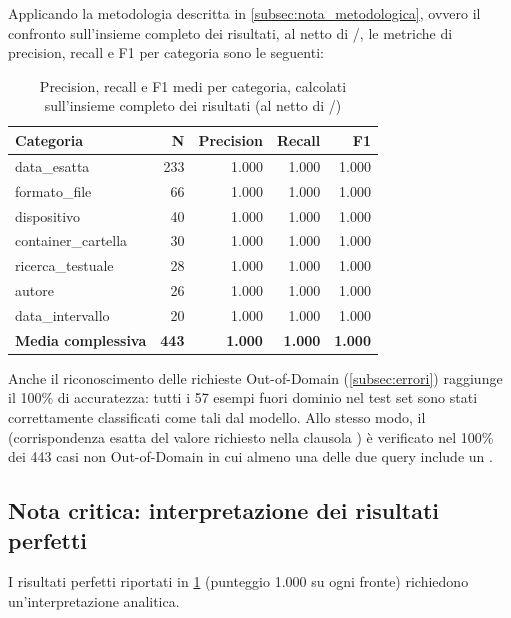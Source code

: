Applicando la metodologia descritta in \cref{subsec:nota_metodologica}, ovvero il confronto sull'insieme completo dei risultati, al netto di /, le metriche di precision, recall e F1 per categoria sono le seguenti:

\begin{table}[ht]
\centering
\begin{tabular}{lrrrr}
\toprule
Categoria & N & Precision & Recall & F1 \\
\midrule
data\_esatta        & 233 & 1.000 & 1.000 & 1.000 \\
formato\_file       & 66  & 1.000 & 1.000 & 1.000 \\
dispositivo         & 40  & 1.000 & 1.000 & 1.000 \\
container\_cartella & 30  & 1.000 & 1.000 & 1.000 \\
ricerca\_testuale   & 28  & 1.000 & 1.000 & 1.000 \\
autore              & 26  & 1.000 & 1.000 & 1.000 \\
data\_intervallo    & 20  & 1.000 & 1.000 & 1.000 \\
\midrule
\textbf{Media complessiva} & \textbf{443} & \textbf{1.000} & \textbf{1.000} & \textbf{1.000} \\
\bottomrule
\end{tabular}
\caption{Precision, recall e F1 medi per categoria, calcolati sull'insieme completo dei risultati (al netto di /)}\label{tab:metriche_categoria}
\end{table}

Anche il riconoscimento delle richieste Out-of-Domain (\cref{subsec:errori}) raggiunge il 100\% di accuratezza: tutti i 57 esempi fuori dominio nel test set sono stati correttamente classificati come tali dal modello. Allo stesso modo, il  (corrispondenza esatta del valore richiesto nella clausola ) è verificato nel 100\% dei 443 casi non Out-of-Domain in cui almeno una delle due query include un .

\subsection{Nota critica: interpretazione dei risultati perfetti}\label{subsec:nota_critica}

I risultati perfetti riportati in \cref{tab:metriche_categoria} (punteggio 1.000 su ogni fronte) richiedono un'interpretazione analitica.

